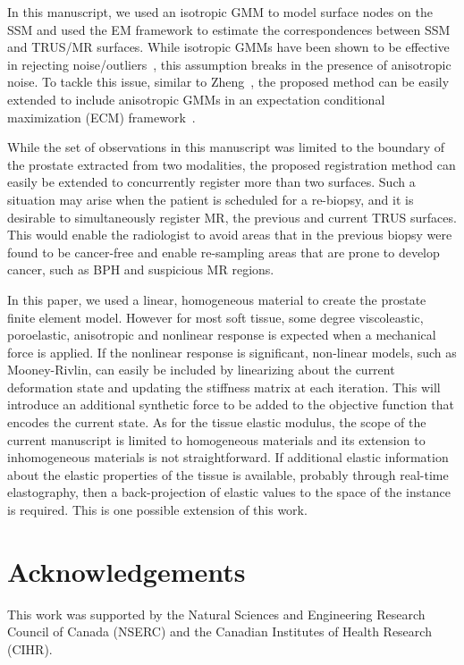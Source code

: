 \documentclass[journal]{IEEEtran}
\begin{document}
In this manuscript, we used an isotropic GMM to model surface nodes on the SSM and used the EM framework to estimate the correspondences between SSM and TRUS/MR surfaces. While isotropic GMMs have been shown to be effective in rejecting noise/outliers~\cite{Myronenko10a}, this assumption breaks in the presence of anisotropic noise. To tackle this issue, similar to Zheng~\cite{Zheng13a}, the proposed method can be easily extended to include anisotropic GMMs in an expectation conditional maximization (ECM) framework~\cite{Horaud11a}.

While the set of observations in this manuscript was limited to the boundary of the prostate extracted from two modalities, the proposed registration method can easily be extended to concurrently register more than two surfaces. Such a situation may arise when the patient is scheduled for a re-biopsy, and it is desirable to simultaneously register MR, the previous and current TRUS surfaces. This would enable the radiologist to avoid areas that in the previous biopsy were found to be cancer-free and enable re-sampling areas that are prone to develop cancer, such as BPH and suspicious MR regions.

In this paper, we used a linear, homogeneous material to create the prostate finite element model. However for most soft tissue, some degree viscoleastic, poroelastic, anisotropic and nonlinear response is expected when a mechanical force is applied. If the nonlinear response is significant, non-linear models, such as Mooney-Rivlin, can easily be included by linearizing about the current deformation state and updating the stiffness matrix at each iteration. This will introduce an additional synthetic force to be added to the objective function that encodes the current state. As for the tissue elastic modulus, the scope of the current manuscript is limited to homogeneous materials and its extension to inhomogeneous materials is not straightforward. If additional elastic information about the elastic properties of the tissue is available, probably through real-time elastography, then a back-projection of elastic values to the space of the instance is required. This is one possible extension of this work.
\section*{Acknowledgements}
This work was supported by the Natural Sciences and Engineering Research Council of Canada (NSERC) and the Canadian Institutes of Health Research (CIHR).
\appendices
\end{document}
